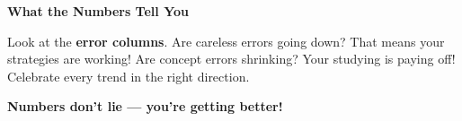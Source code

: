 {\vspace{3mm}

\begin{tcolorbox}[
    enhanced,
    colback=funYellowLight,
    colframe=funYellow!60,
    arc=10pt,
    boxrule=1pt,
    left=6mm, right=6mm, top=4mm, bottom=4mm,
]
{\bfseries\color{funYellowDark} \faLightbulb\hspace{2mm}What the Numbers Tell You}

\vspace{2mm}

Look at the \textbf{error columns}. Are careless errors going down? That means your strategies are working! Are concept errors shrinking? Your studying is paying off! Celebrate every trend in the right direction.
\end{tcolorbox}

\vspace{4mm}

\begin{center}
{\large\bfseries\color{funTealDark} \faStar\hspace{2mm}Numbers don't lie — you're getting better!\hspace{2mm}\faStar}
\end{center}

}
\newpage
